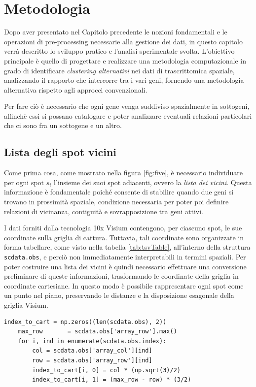 \chapter{Metodologia}\label{chapter:metodologia}
Dopo aver presentato nel Capitolo precedente le nozioni 
fondamentali e le operazioni di pre-processing necessarie 
alla gestione dei dati, in questo capitolo 
verrà descritto lo sviluppo pratico e l'analisi sperimentale svolta.  
L'obiettivo principale è quello di progettare e realizzare 
una metodologia computazionale in grado di 
identificare \textit{clustering alternativi} nei dati di trascrittomica spaziale, 
analizzando il rapporto che intercorre tra i vari geni, fornendo una 
metodologia alternativa rispetto agli approcci convenzionali.

Per fare ciò è necessario che ogni gene venga suddiviso spazialmente in sottogeni, affinchè essi si possano 
catalogare e poter analizzare eventuali relazioni particolari che ci sono fra un sottogene e un altro.
\section{Lista degli spot vicini}\label{subsec:Vicini}
Come prima cosa, come mostrato nella figura \ref{fig:five}, è necessario individuare per ogni spot $s_i$ 
l'insieme dei suoi spot adiacenti, ovvero la \textit{lista dei vicini}. 
Questa informazione è fondamentale poiché consente di stabilire quando due geni si trovano in prossimità spaziale,
condizione necessaria per poter poi definire relazioni di vicinanza, contiguità e sovrapposizione tra geni attivi.

I dati forniti dalla tecnologia 10x Visium contengono, per ciascuno spot, 
le sue coordinate sulla griglia di cattura. 
Tuttavia, tali coordinate sono organizzate in forma tabellare, come visto nella tabella \ref{tab:tsvTable}, all'interno della struttura \texttt{scdata.obs},
e perciò non immediatamente interpretabili in termini spaziali. 
Per poter costruire una lista dei vicini è quindi necessario effettuare una conversione preliminare di queste informazioni,
trasformando le coordinate della griglia in coordinate cartesiane.
In questo modo è possibile rappresentare ogni spot come un punto nel piano, preservando le distanze e la disposizione
esagonale della griglia Visium.
\newpage
\begin{lstlisting}[style=mypython,
                   label=code:index_to_cart,
                   caption={Trasformazione delle coordinate spaziali in coordinate cartesiane},
                   basicstyle=\ttfamily\scriptsize]
    index_to_cart = np.zeros((len(scdata.obs), 2))
    max_row       = scdata.obs['array_row'].max()
    for i, ind in enumerate(scdata.obs.index):
        col = scdata.obs['array_col'][ind]
        row = scdata.obs['array_row'][ind]
        index_to_cart[i, 0] = col * (np.sqrt(3)/2)
        index_to_cart[i, 1] = (max_row - row) * (3/2)
\end{lstlisting}

